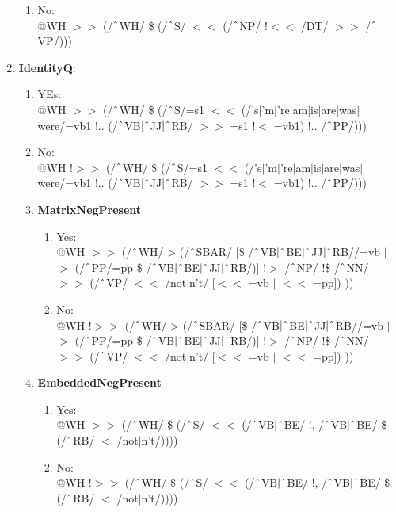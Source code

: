 \begin{enumerate}
\begin{enumerate}
            \item No: \\
            @WH $>\!\!>$ (/$\string^$WH/ \$ (/$\string^$S/ $<\!\!<$ (/$\string^$NP/ !$<\!\!<$ /DT/ $>\!\!>$ /$\string^$VP/)))
        \end{enumerate}
    \item \textbf{IdentityQ}:\\
    \begin{enumerate}
        \item YEs:\\
        @WH $>\!\!>$ (/$\string^$WH/ \$ (/$\string^$S/=s1 $<\!\!<$ (/'s$|$'m$|$'re$|$am$|$is$|$are$|$was$|$were/=vb1 !.. (/$\string^$VB$|\string^$JJ$|\string^$RB/ $>\!\!>$ =s1 !$<$ =vb1) !.. /$\string^$PP/)))
        \item No:\\
        @WH !$>\!\!>$ (/$\string^$WH/ \$ (/$\string^$S/=s1 $<\!\!<$ (/'s$|$'m$|$'re$|$am$|$is$|$are$|$was$|$were/=vb1 !.. (/$\string^$VB$|\string^$JJ$|\string^$RB/ $>\!\!>$ =s1 !$<$ =vb1) !.. /$\string^$PP/)))
    \item \textbf{MatrixNegPresent}
    \begin{enumerate}
        \item Yes:\\
        @WH $>\!\!>$ (/$\string^$WH/ > (/$\string^$SBAR/ [\$ /$\string^$VB$|\string^$BE$|\string^$JJ$|\string^$RB//=vb $|$ \\
        $>$ (/$\string^$PP/=pp \$ /$\string^$VB$|\string^$BE$|\string^$JJ$|\string^$RB/)] !$>$ /$\string^$NP/ !\$ /$\string^$NN/ $>\!\!>$ (/$\string^$VP/ $<\!\!<$ /not$|$n't/ [$<\!\!<$ =vb $|$ $<\!\!<$ =pp]) ))
        \item No:\\
        @WH !$>\!\!>$ (/$\string^$WH/ > (/$\string^$SBAR/ [\$ /$\string^$VB$|\string^$BE$|\string^$JJ$|\string^$RB//=vb $|$ \\
        $>$ (/$\string^$PP/=pp \$ /$\string^$VB$|\string^$BE$|\string^$JJ$|\string^$RB/)] !$>$ /$\string^$NP/ !\$ /$\string^$NN/ $>\!\!>$ (/$\string^$VP/ $<\!\!<$ /not$|$n't/ [$<\!\!<$ =vb $|$ $<\!\!<$ =pp]) ))
    \end{enumerate}
    
    \item \textbf{EmbeddedNegPresent}
    \begin{enumerate}
        \item Yes:\\
        @WH $>\!\!>$ (/$\string^$WH/ \$ (/$\string^$S/ $<\!\!<$ (/$\string^$VB$|\string^$BE/ !, /$\string^$VB$|\string^$BE/ \$ (/$\string^$RB/ $<$ /not$|$n't/))))

        \item No:\\
        @WH !$>\!\!>$ (/$\string^$WH/ \$ (/$\string^$S/ $<\!\!<$ (/$\string^$VB$|\string^$BE/ !, /$\string^$VB$|\string^$BE/ \$ (/$\string^$RB/ $<$ /not$|$n't/))))
    \end{enumerate}
    \end{enumerate}
    
\end{enumerate}

